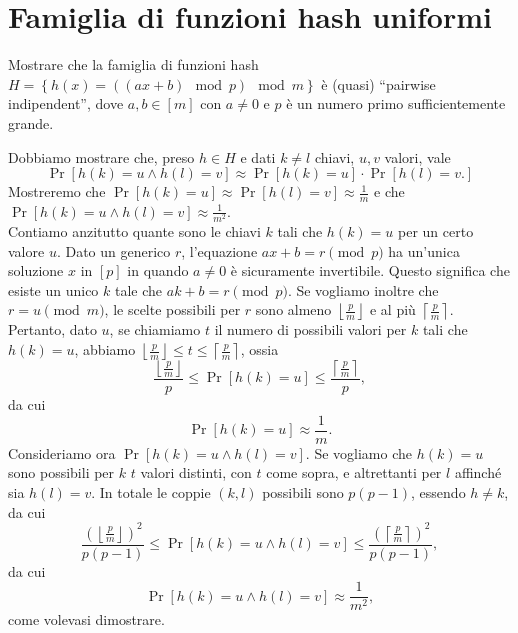 \chapter{Famiglia di funzioni hash uniformi}

\begin{problem*}
    Mostrare che la famiglia di funzioni hash 
    \(H = \left\{h(x) = ((ax + b ) \mod p) \mod m\right\}\) \`e (quasi) ``pairwise 
    indipendent'', dove \(a,b\in [m]\) con \(a\neq 0\) e \(p\) \`e un numero primo 
    sufficientemente grande.
\end{problem*}
Dobbiamo mostrare che, preso $h\in H$ e dati $k\neq l$ chiavi, $u, v$ valori, vale \[\Pr[h(k)=u \wedge h(l)=v]\approx\Pr[h(k)=u]\cdot\Pr[h(l)=v.]\] Mostreremo che $\Pr[h(k)=u]\approx\Pr[h(l)=v]\approx\frac{1}{m}$ e che $\Pr[h(k)=u \wedge h(l)=v]\approx\frac{1}{m^2}$.
\[\]
Contiamo anzitutto quante sono le chiavi $k$ tali che $h(k)=u$ per un certo valore $u$.\newline
Dato un generico $r$, l'equazione $ax+b=r \pmod p$ ha un'unica soluzione $x$ in $[p]$ in quando $a\neq0$ è sicuramente invertibile. Questo significa che esiste un unico $k$ tale che $ak+b=r \pmod p$.\newline
Se vogliamo inoltre che $r = u \pmod m$, le scelte possibili per $r$ sono almeno $\left\lfloor\frac{p}{m}\right\rfloor$ e al più $\left\lceil \frac{p}{m}\right\rceil$.\newline
Pertanto, dato $u$, se chiamiamo $t$ il numero di possibili valori per $k$ tali che $h(k)=u$, abbiamo $\left\lfloor\frac{p}{m}\right\rfloor\le t \le \left\lceil \frac{p}{m}\right\rceil$, ossia \[\frac{\left\lfloor\frac{p}{m}\right\rfloor}{p}\le\Pr[h(k)=u]\le\frac{\left\lceil \frac{p}{m}\right\rceil}{p},\] da cui \[\Pr[h(k)=u]\approx\frac{1}{m}.\]
\[\]
Consideriamo ora $\Pr[h(k)=u \wedge h(l)=v]$. Se vogliamo che $h(k)=u$ sono possibili per $k$ $t$ valori distinti, con $t$ come sopra, e altrettanti per $l$ affinché sia $h(l)=v$. In totale le coppie $(k, l)$ possibili sono $p(p-1)$, essendo $h\neq k$, da cui \[\frac{\left(\left\lfloor\frac{p}{m}\right\rfloor\right)^2}{p(p-1)}\le \Pr[h(k)=u \wedge h(l)=v]\le\frac{\left(\left\lceil \frac{p}{m}\right\rceil\right)^2}{p(p-1)},\] da cui \[\Pr[h(k)=u \wedge h(l)=v]\approx\frac{1}{m^2},\] come volevasi dimostrare. 

